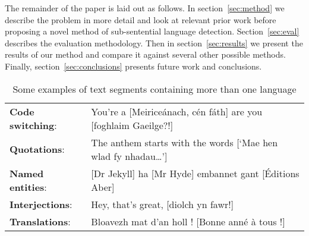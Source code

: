 \documentclass[11pt]{article}
\begin{document}
The remainder of the paper is laid out as follows. In section~\ref{sec:method} we describe the problem
in more detail and look at relevant prior work before proposing a novel method of sub-sentential
language detection. Section~\ref{sec:eval} describes the evaluation methodology. Then in section~\ref{sec:results}
we present the results of our method and compare it against several other possible methods. Finally, section~\ref{sec:conclusions}
presents future work and conclusions.


\begin{table}[h]
\begin{center}
\vspace{-0.3cm}
\begin{tabular}{ll}
\textbf{Code switching}: & You're a [Meirice\'{a}nach, c\'{e}n f\'{a}th] are you [foghlaim Gaeilge?!] \\
\textbf{Quotations}: & The anthem starts with the words [`Mae hen wlad fy nhadau\ldots'] \\
\textbf{Named entities}: & [Dr Jekyll] ha [Mr Hyde] embannet gant [\'{E}ditions Aber] \\
\textbf{Interjections}: & Hey, that's great, [diolch yn fawr!] \\
\textbf{Translations}: & Bloavezh mat d'an holl ! [Bonne ann\'{e} \`{a} tous !] \\
\end{tabular}
\caption{Some examples of text segments containing more than one language}
\label{table:examples}
\end{center}
\end{table}
\vspace{-0.6cm}
\end{document}
